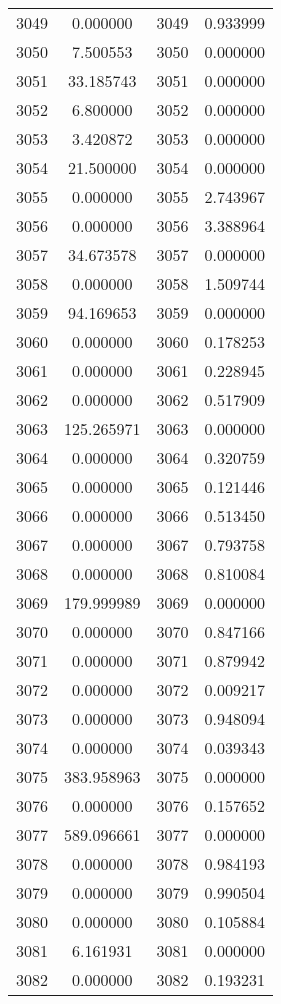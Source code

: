 \documentclass[12pt]{article}
\begin{document}
\begin{longtable}{@{}cccc@{}}
3049 & 0.000000 & 3049 & 0.933999 \\
3050 & 7.500553 & 3050 & 0.000000 \\
3051 & 33.185743 & 3051 & 0.000000 \\
3052 & 6.800000 & 3052 & 0.000000 \\
3053 & 3.420872 & 3053 & 0.000000 \\
3054 & 21.500000 & 3054 & 0.000000 \\
3055 & 0.000000 & 3055 & 2.743967 \\
3056 & 0.000000 & 3056 & 3.388964 \\
3057 & 34.673578 & 3057 & 0.000000 \\
3058 & 0.000000 & 3058 & 1.509744 \\
3059 & 94.169653 & 3059 & 0.000000 \\
3060 & 0.000000 & 3060 & 0.178253 \\
3061 & 0.000000 & 3061 & 0.228945 \\
3062 & 0.000000 & 3062 & 0.517909 \\
3063 & 125.265971 & 3063 & 0.000000 \\
3064 & 0.000000 & 3064 & 0.320759 \\
3065 & 0.000000 & 3065 & 0.121446 \\
3066 & 0.000000 & 3066 & 0.513450 \\
3067 & 0.000000 & 3067 & 0.793758 \\
3068 & 0.000000 & 3068 & 0.810084 \\
3069 & 179.999989 & 3069 & 0.000000 \\
3070 & 0.000000 & 3070 & 0.847166 \\
3071 & 0.000000 & 3071 & 0.879942 \\
3072 & 0.000000 & 3072 & 0.009217 \\
3073 & 0.000000 & 3073 & 0.948094 \\
3074 & 0.000000 & 3074 & 0.039343 \\
3075 & 383.958963 & 3075 & 0.000000 \\
3076 & 0.000000 & 3076 & 0.157652 \\
3077 & 589.096661 & 3077 & 0.000000 \\
3078 & 0.000000 & 3078 & 0.984193 \\
3079 & 0.000000 & 3079 & 0.990504 \\
3080 & 0.000000 & 3080 & 0.105884 \\
3081 & 6.161931 & 3081 & 0.000000 \\
3082 & 0.000000 & 3082 & 0.193231 \\

\end{longtable}
\end{document}
